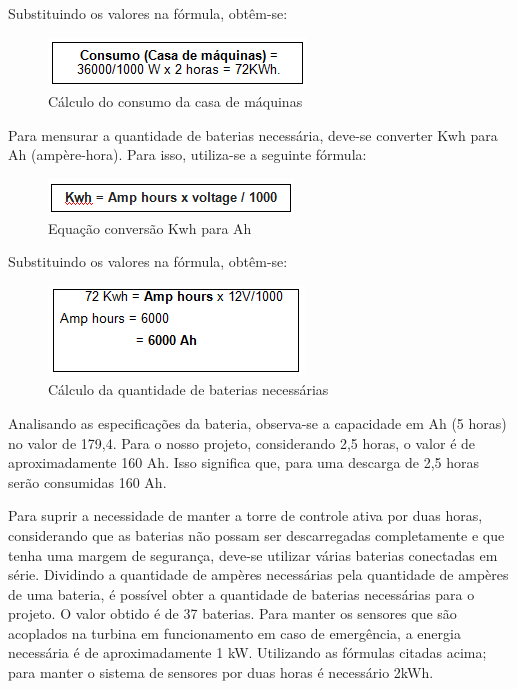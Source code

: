 Substituindo os valores na fórmula, obtêm-se:
\FloatBarrier
\begin{figure}[!ht]
\centering
\includegraphics[scale=1]{editaveis/figuras/consumo_sub}
\caption[Consumo]{Cálculo do consumo da casa de máquinas}
\label{consumo}
\end{figure}
\FloatBarrier

Para mensurar a quantidade de baterias necessária, deve-se converter Kwh para Ah (ampère-hora). Para isso, utiliza-se a seguinte fórmula:
\FloatBarrier
\begin{figure}[!ht]
\centering
\includegraphics[scale=1]{editaveis/figuras/bateria_necessaria}
\caption[Equacao conversão]{Equação conversão Kwh para Ah\footnotemark}
\label{conversao}
\end{figure}
\FloatBarrier

Substituindo os valores na fórmula, obtêm-se:
\FloatBarrier
\begin{figure}[!ht]
\centering
\includegraphics[scale=1]{editaveis/figuras/conversao_sub}
\caption[Conversao]{Cálculo da quantidade de baterias necessárias}
\label{conversao}
\end{figure}
\FloatBarrier

Analisando as especificações da bateria, observa-se a capacidade em Ah (5 horas) no valor de 179,4. Para o nosso projeto, considerando 2,5 horas, o valor é de aproximadamente 160 Ah. Isso significa que, para uma descarga de 2,5 horas serão consumidas 160 Ah.  

Para suprir a necessidade de manter a torre de controle ativa por duas horas, considerando que as baterias não possam ser descarregadas completamente e que tenha uma margem de segurança, deve-se utilizar várias baterias conectadas em série.
Dividindo a quantidade de ampères necessárias pela quantidade de ampères de uma bateria, é possível obter a quantidade de baterias necessárias para o projeto. O valor obtido é de 37 baterias.
Para manter os sensores que são acoplados na turbina em funcionamento em caso de emergência, a energia necessária é de aproximadamente 1 kW. Utilizando as fórmulas citadas acima; para manter o sistema de sensores por duas horas é necessário 2kWh.

